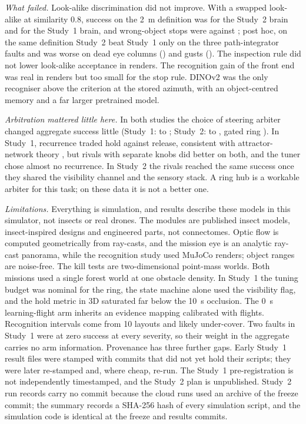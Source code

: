 \documentclass[10pt,twocolumn]{article}
\begin{document}
\emph{What failed.} Look-alike discrimination did not improve. With a swapped look-alike at similarity 0.8, success on the 2~m definition was \StwoMidDecoyOwn{} for the Study~2 brain and \StwoVoneMidDecoyOwn{} for the Study~1 brain, and wrong-object stops were \StwoWrongRing{} against \StwoWrongVone; post hoc, on the same definition Study~2 beat Study~1 only on the three path-integrator faults and was worse on dead eye columns (\StwoOwnDiffEye) and gusts (\StwoOwnDiffGust). The inspection rule did not lower look-alike acceptance in renders. The recognition gain of the front end was real in renders but too small for the stop rule. DINOv2 was the only recogniser above the criterion at the stored azimuth, with an object-centred memory and a far larger pretrained model.

\emph{Arbitration mattered little here.} In both studies the choice of steering arbiter changed aggregate success little (Study~1: \SoneAUCRing{} to \SoneAUCSM; Study~2: \StwoRivalLo{} to \StwoRivalHi, gated ring \StwoAUC). In Study~1, recurrence traded hold against release, consistent with attractor-network theory \citep{zhang1996,compte2000}, but rivals with separate knobs did better on both, and the tuner chose almost no recurrence. In Study~2 the rivals reached the same success once they shared the visibility channel and the sensory stack. A ring hub is a workable arbiter for this task; on these data it is not a better one.

\emph{Limitations.} Everything is simulation, and results describe these models in this simulator, not insects or real drones. The modules are published insect models, insect-inspired designs and engineered parts, not connectomes. Optic flow is computed geometrically from ray-casts, and the mission eye is an analytic ray-cast panorama, while the recognition study used MuJoCo renders; object ranges are noise-free. The kill tests are two-dimensional point-mass worlds. Both missions used a single forest world at one obstacle density. In Study~1 the tuning budget was nominal for the ring, the state machine alone used the visibility flag, and the hold metric in 3D saturated far below the 10~s occlusion. The 0~s learning-flight arm inherits an evidence mapping calibrated with flights. Recognition intervals come from 10 layouts and likely under-cover. Two faults in Study~1 were at zero success at every severity, so their weight in the aggregate carries no arm information. Provenance has three further gaps. Early Study~1 result files were stamped with commits that did not yet hold their scripts; they were later re-stamped and, where cheap, re-run. The Study~1 pre-registration is not independently timestamped, and the Study~2 plan is unpublished. Study~2 run records carry no commit because the cloud runs used an archive of the freeze commit; the summary records a SHA-256 hash of every simulation script, and the simulation code is identical at the freeze and results commits.
\end{document}
